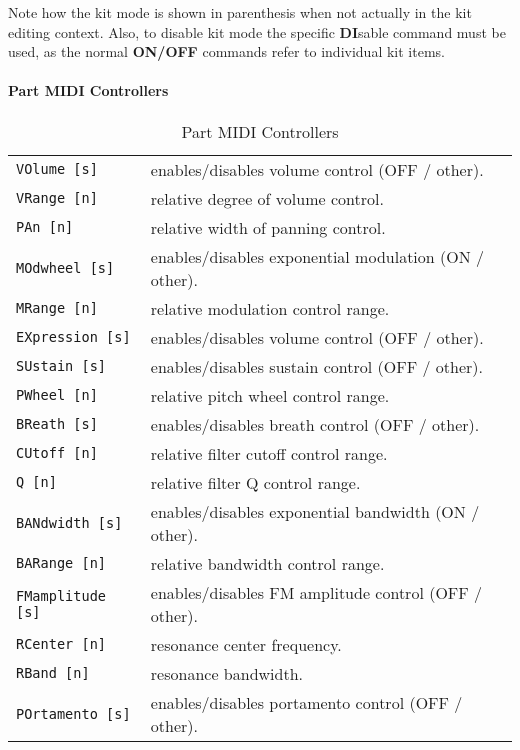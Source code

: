    Note how the kit mode is shown in parenthesis when not actually in the kit
   editing context. Also, to disable kit mode the specific \textbf{DI}sable
   command must be used, as the normal \textbf{ON/OFF} commands refer to
   individual kit items.

\paragraph{Part MIDI Controllers}
\label{paragraph:command_line_part_midi_commands}
   \begin{table}[H]
      \centering
      \caption{Part MIDI Controllers}
      \label{table:yoshimi_part_midi_commands}
      \begin{tabular}{l l}
\texttt{VOlume [s]} &
   enables/disables volume control (OFF / other). \\
\texttt{VRange [n]} &
   relative degree of volume control. \\
\texttt{PAn [n]} &
   relative width of panning control. \\
\texttt{MOdwheel [s]} &
   enables/disables exponential modulation (ON / other). \\
\texttt{MRange [n]} &
   relative modulation control range. \\
\texttt{EXpression [s]} &
   enables/disables volume control (OFF / other). \\
\texttt{SUstain [s]} &
   enables/disables sustain control (OFF / other). \\
\texttt{PWheel [n]} &
   relative pitch wheel control range. \\
\texttt{BReath [s]} &
   enables/disables breath control (OFF / other). \\
\texttt{CUtoff [n]} &
   relative filter cutoff control range. \\
\texttt{Q [n]} &
   relative filter Q control range. \\
\texttt{BANdwidth [s]} &
   enables/disables exponential bandwidth (ON / other). \\
\texttt{BARange [n]} &
   relative bandwidth control range. \\
\texttt{FMamplitude [s]} &
   enables/disables FM amplitude control (OFF / other). \\
\texttt{RCenter [n]} &
   resonance center frequency. \\
\texttt{RBand [n]} &
   resonance bandwidth. \\
\texttt{POrtamento [s]} &
   enables/disables portamento control (OFF / other). \\

\end{tabular}
\end{table}
